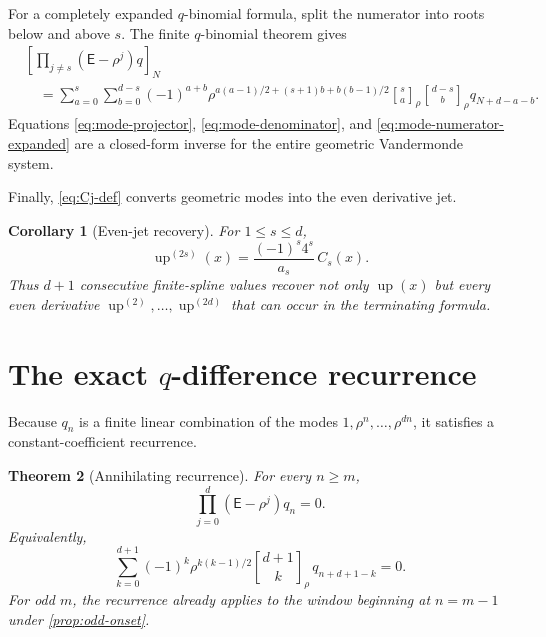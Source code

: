 \documentclass[11pt,oneside]{article}
\newtheorem{theorem}{Theorem}[section]
\newtheorem{corollary}[theorem]{Corollary}
\theoremstyle{definition}
\theoremstyle{remark}
\newcommand{\up}{\operatorname{up}}
\newcommand{\E}{\mathsf E}
\newcommand{\qbinom}[3]{\genfrac{[}{]}{0pt}{}{#1}{#2}_{#3}}
\begin{document}
For a completely expanded \(q\)-binomial formula, split the numerator into
roots below and above \(s\).  The finite \(q\)-binomial theorem gives
\begin{align}\label{eq:mode-numerator-expanded}
 &\left[\prod_{j\ne s}(\E-\rho^j)q\right]_N\\
 &\quad=\sum_{a=0}^{s}\sum_{b=0}^{d-s}
 (-1)^{a+b}
 \rho^{a(a-1)/2+(s+1)b+b(b-1)/2}
 \qbinom{s}{a}{\rho}\qbinom{d-s}{b}{\rho}
 q_{N+d-a-b}.\nonumber
\end{align}
Equations \eqref{eq:mode-projector}, \eqref{eq:mode-denominator}, and
\eqref{eq:mode-numerator-expanded} are a closed-form inverse for the entire
geometric Vandermonde system.

Finally, \eqref{eq:Cj-def} converts geometric modes into the even derivative
jet.

\begin{corollary}[Even-jet recovery]\label{cor:jet-recovery}
For \(1\le s\le d\),
\begin{equation}\label{eq:jet-recovery}
 \boxed{\displaystyle
 \up^{(2s)}(x)=\frac{(-1)^s4^s}{a_s}\,C_s(x).}
\end{equation}
Thus \(d+1\) consecutive finite-spline values recover not only \(\up(x)\)
but every even derivative \(\up^{(2)},\ldots,\up^{(2d)}\) that can occur in
the terminating formula.
\end{corollary}

\section{The exact \texorpdfstring{$q$}{q}-difference recurrence}

Because \(q_n\) is a finite linear combination of the modes
\(1,\rho^n,\ldots,\rho^{dn}\), it satisfies a constant-coefficient recurrence.

\begin{theorem}[Annihilating recurrence]\label{thm:recurrence}
For every \(n\ge m\),
\begin{equation}\label{eq:operator-recurrence}
 \prod_{j=0}^{d}(\E-\rho^j)q_n=0.
\end{equation}
Equivalently,
\begin{equation}\label{eq:qbinomial-recurrence}
 \boxed{\displaystyle
 \sum_{k=0}^{d+1}(-1)^k\rho^{k(k-1)/2}
 \qbinom{d+1}{k}{\rho}\,
 q_{n+d+1-k}=0.}
\end{equation}
For odd \(m\), the recurrence already applies to the window beginning at
\(n=m-1\) under \cref{prop:odd-onset}.
\end{theorem}
\end{document}
